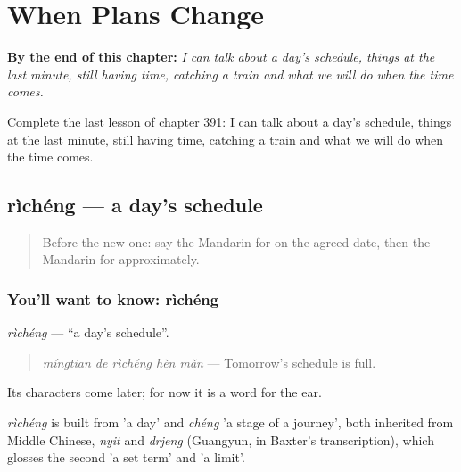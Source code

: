 
\chapter{When Plans Change}
\label{ch:zh-when-plans-change}

\begin{chapteropening}
\textbf{By the end of this chapter:} \emph{I can talk about a day's schedule, things at the last minute, still having time, catching a train and what we will do when the time comes.}

Complete the last lesson of chapter 391: I can talk about a day's schedule, things at the last minute, still having time, catching a train and what we will do when the time comes.
\end{chapteropening}

\section[rìchéng]{rìchéng — a day's schedule}

\label{lesson:ZH-C391-richeng}



\begin{quote}
Before the new one: say the Mandarin for on the agreed date, then the Mandarin for approximately.
\end{quote}

\subsection*{You'll want to know: rìchéng}
\emph{rìchéng} — \textquotedblleft{}a day's schedule\textquotedblright{}.

\begin{quote}
\emph{míngtiān de rìchéng hěn mǎn} — Tomorrow's schedule is full.
\end{quote}

Its characters come later; for now it is a word for the ear.

\begin{cousinweb}
\emph{rìchéng} is built from  'a day' and \emph{chéng} 'a stage of a journey', both inherited from Middle Chinese, \emph{nyit} and \emph{drjeng} (Guangyun, in Baxter's transcription), which glosses the second 'a set term' and 'a limit'.
\end{cousinweb}

